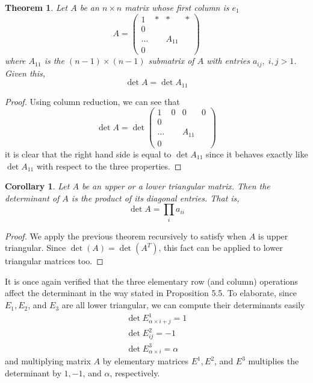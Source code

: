 \documentclass{article}
\newtheorem{theorem}{Theorem}[section]
\newtheorem{corollary}{Corollary}[theorem]
\theoremstyle{remark}
\theoremstyle{definition}
\begin{document}
\begin{theorem}
Let $A$ be an $n \times n$ matrix whose first column is $e_1$
\[A = \begin{pmatrix}
1&*&*&* \\
0 &&& \\
\ldots& & A_{11}& \\
0&&&
\end{pmatrix}\]
where $A_{11}$ is the $(n-1) \times (n-1)$ submatrix of $A$ with entries $a_{i j}, \; i, j > 1$. Given this, 
\[\det{A} = \det{A_{11}}\]
\end{theorem}
\begin{proof}
Using column reduction, we can see that 
\[ \det{A} = \det{\begin{pmatrix}
1&0&0&0 \\
0 &&& \\
\ldots& & A_{11}& \\
0&&&
\end{pmatrix}}\]
it is clear that the right hand side is equal to $\det{A_{11}}$ since it behaves exactly like $\det{A_{11}}$ with respect to the three properties. 
\end{proof}

\begin{corollary}
Let $A$ be an upper or a lower triangular matrix. Then the determinant of $A$ is the product of its diagonal entries. That is,  
\[ \det{A} = \prod_{i} a_{i i}\]
\end{corollary}
\begin{proof}
We apply the previous theorem recursively to satisfy when $A$ is upper triangular. Since $\det{(A)} = \det{(A^T)}$, this fact can be applied to lower triangular matrices too. 
\end{proof}

It is once again verified that the three elementary row (and column) operations affect the determinant in the way stated in Proposition 5.5. To elaborate, since $E_1, E_2$, and $E_3$ are all lower triangular, we can compute their determinants easily
\begin{align*}
    \det{E^1_{\alpha \times i + j}} = 1 \\
    \det{E^2_{i j}} = -1 \\
    \det{E^3_{\alpha \times i}} = \alpha
\end{align*}
and multiplying matrix $A$ by elementary matrices $E^1, E^2$, and $E^3$ multiplies the determinant by $1, -1$, and $\alpha$, respectively. 
\\
\end{document}
